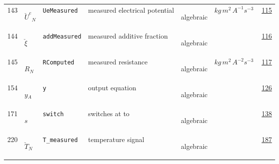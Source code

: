 \begin{longtable}{|p{1cm}|p{2.5cm}|p{4.5cm}|p{8cm}|p{3.0cm}|p{3cm}|p{1cm}|}
                 \\
            143
             & \hypertarget{"v:143"}{ $ {{\check{U}^e}}{_{N}} $}
             & \verb|UeMeasured|
             & measured electrical potential
             & \begin{lay}algebraic \end{lay}
             & $ kg \,m^{2} \,A^{-1} s^{-3} \, $
             &                 \hyperlink{"e:115"}{ 115 }
                 \\
            144
             & \hypertarget{"v:144"}{ $ {{\check{\xi}}}{_{}} $}
             & \verb|addMeasured|
             & measured additive fraction
             & \begin{lay}algebraic \end{lay}
             & $  $
             &                 \hyperlink{"e:116"}{ 116 }
                 \\
            145
             & \hypertarget{"v:145"}{ $ {R}{_{N}} $}
             & \verb|RComputed|
             & measured resistance 
             & \begin{lay}algebraic \end{lay}
             & $ kg \,m^{2} \,A^{-2} s^{-3} \, $
             &                 \hyperlink{"e:117"}{ 117 }
                 \\
            154
             & \hypertarget{"v:154"}{ $ {y}{_{A}} $}
             & \verb|y|
             & output equation
             & \begin{lay}algebraic \end{lay}
             & $  $
             &                 \hyperlink{"e:126"}{ 126 }
                 \\
            171
             & \hypertarget{"v:171"}{ $ {s}{_{}} $}
             & \verb|switch|
             & switches at to
             & \begin{lay}algebraic \end{lay}
             & $  $
             &                 \hyperlink{"e:138"}{ 138 }
                 \\
            220
             & \hypertarget{"v:220"}{ $ {{\breve{T}}}{_{N}} $}
             & \verb|T_measured|
             & temperature signal
             & \begin{lay}algebraic \end{lay}
             & $  $
             &                 \hyperlink{"e:187"}{ 187 }
                 \\
    \end{longtable}